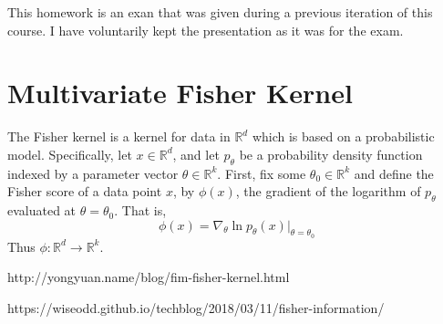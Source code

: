 \documentclass[11pt]{article}
\begin{document}
\noindent
This homework is an exan that was given during a previous iteration of this course. I have voluntarily kept the presentation as it was for the exam. 
\noindent
\noindent 

\section{Multivariate Fisher Kernel}
The Fisher kernel is a kernel for data in $\mathbb{R}^d$ which is based on a probabilistic model. Specifically, let $x \in \mathbb{R}^d$, and let $p_{\theta}$ be a probability density function indexed by a parameter vector $\theta \in \mathbb{R}^k$.  First, fix some $\theta_0 \in \mathbb{R}^k$ and define the Fisher score of a data point $x$, by $\phi(x)$, the gradient of the logarithm of $p_{\theta}$ evaluated at $\theta=\theta_0$. That is, 
\begin{equation}
\phi(x)=\nabla_\theta \ln p_{\theta}(x) |_{\theta=\theta_0}
\end{equation}
Thus $\phi: \mathbb{R}^d \to \mathbb{R}^k$. 

http://yongyuan.name/blog/fim-fisher-kernel.html

https://wiseodd.github.io/techblog/2018/03/11/fisher-information/
\end{document}
